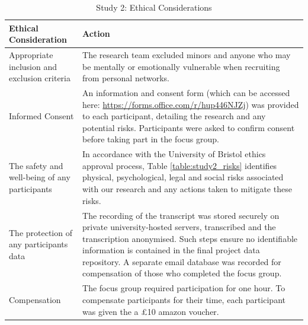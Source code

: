 \documentclass[manuscript,screen,review]{acmart}
\begin{document}
\begin{table}[h]
\begin{center}
\begin{tabular}{ | p{3cm} | p{11cm} |}
\hline
 Ethical Consideration & Action \\
 \hline
 \hline
 Appropriate inclusion and exclusion criteria & The research team excluded minors and anyone who may be mentally or emotionally vulnerable when recruiting from personal networks. \\
 \hline
Informed Consent & An information and consent form (which can be accessed here: \href{https://forms.office.com/r/hup446NJZj}{https://forms.office.com/r/hup446NJZj}) was provided to each participant, detailing the research and any potential risks. Participants were asked to confirm consent before taking part in the focus group. \\
 \hline
 The safety and well-being of any participants & In accordance with the University of Bristol ethics approval process, Table \ref{table:study2_risks} identifies physical, psychological, legal and social risks associated with our research and any actions taken to mitigate these risks. \\
\hline
The protection of any participants data & The recording of the transcript was stored securely on private university-hosted servers, transcribed and the transcription anonymised. Such steps ensure no identifiable information is contained in the final project data repository. A separate email database was recorded for compensation of those who completed the focus group. \\
\hline
Compensation & The focus group required participation for one hour. To compensate participants for their time, each participant was given the a £10 amazon voucher. \\
 \hline
\end{tabular}
\caption{Study 2: Ethical Considerations}
\label{table:study2_ethical_considerations}
\end{center}
\end{table}
\end{document}

